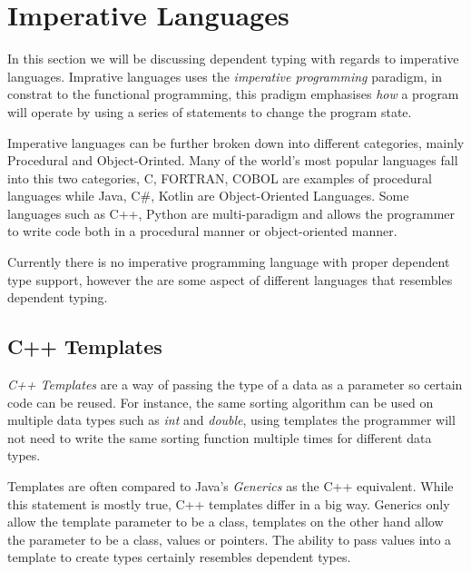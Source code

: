 \documentclass[a4paper,12pt]{report}
\begin{document}
\section{Imperative Languages}

In this section we will be discussing dependent typing with regards to imperative 
languages. Imprative languages uses the \textit{imperative programming} 
\cite{imperativeOverview} paradigm, in constrat to the functional 
programming, this pradigm emphasises \textit{how} a program will operate 
by using a series of statements to change the program state.

\par

Imperative languages can be further broken down into different categories, 
mainly Procedural and Object-Orinted. Many of the world's most popular languages 
fall into this two categories, C, FORTRAN, COBOL are examples of procedural 
languages while Java, C#, Kotlin are Object-Oriented Languages. Some languages such 
as C++, Python are multi-paradigm and allows the programmer to write code both 
in a procedural manner or object-oriented manner. 

\par

Currently there is no imperative programming language with proper dependent type 
support, however the are some aspect of different languages that resembles 
dependent typing. 


\subsection{C++ Templates}
\textit{C++ Templates} \cite{cppTemplate} are a way of passing the type of a 
data as a parameter so certain code can be reused. For instance, the same 
sorting algorithm can be used on multiple data types such as \textit{int} and 
\textit{double}, using templates the programmer will not need to write the same 
sorting function multiple times for different data types. 

\par
Templates are often compared to Java's \textit{Generics} \cite{javaGenerics} 
as the C++ equivalent. While this statement is mostly true, C++ templates 
differ in a big way. 
Generics only allow the template parameter to be a class, templates on the other 
hand allow the parameter to be a class, values or pointers. The ability to 
pass values into a template to create types certainly resembles dependent types.
\end{document}
